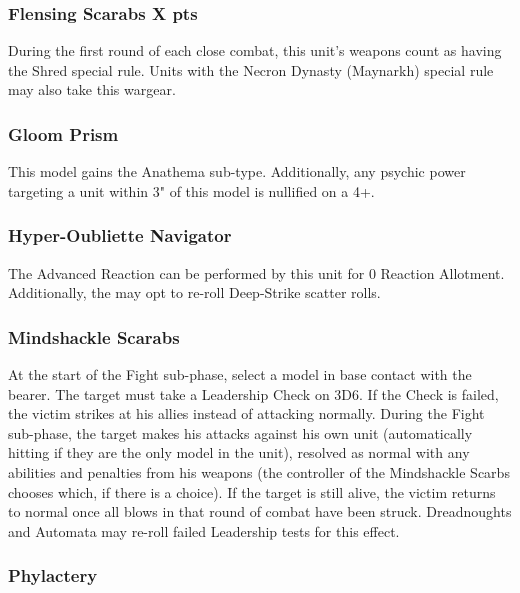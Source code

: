 \subsubsection[Flensing Scarabs]{Flensing Scarabs \hrulefill X pts} \label{Flensing Scarabs}

During the first round of each close combat, this unit's weapons count as having the Shred special rule. Units with the Necron Dynasty (Maynarkh) special rule may also take this wargear.

\subsubsection{Gloom Prism} \label{Gloom Prism}

This model gains the Anathema sub-type. Additionally, any psychic power targeting a unit within 3" of this model is nullified on a 4+. \\

\subsubsection{Hyper-Oubliette Navigator} \label{Hyper-Oubliette Navigator}

The  Advanced Reaction can be performed by this unit for 0 Reaction Allotment. Additionally, the may opt to re-roll Deep-Strike scatter rolls.

\subsubsection{Mindshackle Scarabs} \label{Mindshackle Scarabs}

At the start of the Fight sub-phase, select a model in base contact with the bearer. The target must take a Leadership Check on 3D6. If the Check is failed, the victim strikes at his allies instead of attacking normally. During the Fight sub-phase, the target makes his attacks against his own unit (automatically hitting if they are the only model in the unit), resolved as normal with any abilities and penalties from his weapons (the controller of the Mindshackle Scarbs chooses which, if there is a choice). If the target is still alive, the victim returns to normal once all blows in that round of combat have been struck. Dreadnoughts and Automata may re-roll failed Leadership tests for this effect.

\subsubsection{Phylactery} \label{Phylactery}

